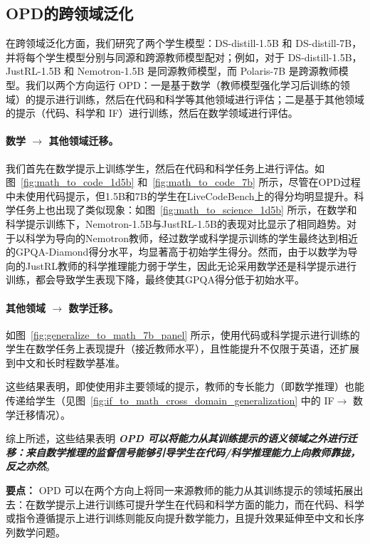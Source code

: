 \subsection{OPD的跨领域泛化}
在跨领域泛化方面，我们研究了两个学生模型：DS-distill-1.5B 和 DS-distill-7B，并将每个学生模型分别与同源和跨源教师模型配对；例如，对于 DS-distill-1.5B，JustRL-1.5B 和 Nemotron-1.5B 是同源教师模型，而 Polaris-7B 是跨源教师模型。我们以两个方向运行 OPD：一是基于数学（教师模型强化学习后训练的领域）的提示进行训练，然后在代码和科学等其他领域进行评估；二是基于其他领域的提示（代码、科学和 IF）进行训练，然后在数学领域进行评估。
\paragraph{数学 $\rightarrow$  其他领域迁移。}
我们首先在数学提示上训练学生，然后在代码和科学任务上进行评估。如图~\ref{fig:math_to_code_1d5b} 和~\ref{fig:math_to_code_7b} 所示，尽管在OPD过程中未使用代码提示，但1.5B和7B的学生在LiveCodeBench上的得分均明显提升。科学任务上也出现了类似现象：如图~\ref{fig:math_to_science_1d5b} 所示，在数学和科学提示训练下，Nemotron-1.5B与JustRL-1.5B的表现对比显示了相同趋势。对于以科学为导向的Nemotron教师，经过数学或科学提示训练的学生最终达到相近的GPQA-Diamond得分水平，均显著高于初始学生得分。然而，由于以数学为导向的JustRL教师的科学推理能力弱于学生，因此无论采用数学还是科学提示进行训练，都会导致学生表现下降，最终使其GPQA得分低于初始水平。

\paragraph{其他领域 $\rightarrow$  数学迁移。}
如图~\ref{fig:generalize_to_math_7b_panel} 所示，使用代码或科学提示进行训练的学生在数学任务上表现提升（接近教师水平），且性能提升不仅限于英语，还扩展到中文和长时程数学基准。

这些结果表明，即使使用非主要领域的提示，教师的专长能力（即数学推理）也能传递给学生（见图~\ref{fig:if_to_math_cross_domain_generalization} 中的 IF$\rightarrow$ 数学迁移情况）。

综上所述，这些结果表明 \textbf{\emph{OPD 可以将能力从其训练提示的语义领域之外进行迁移：来自数学推理的监督信号能够引导学生在代码/科学推理能力上向教师靠拢，反之亦然}}。

\begin{insightbox}
\textbf{要点：}
OPD 可以在两个方向上将同一来源教师的能力从其训练提示的领域拓展出去：在数学提示上进行训练可提升学生在代码和科学方面的能力，而在代码、科学或指令遵循提示上进行训练则能反向提升数学能力，且提升效果延伸至中文和长序列数学问题。
\end{insightbox}

